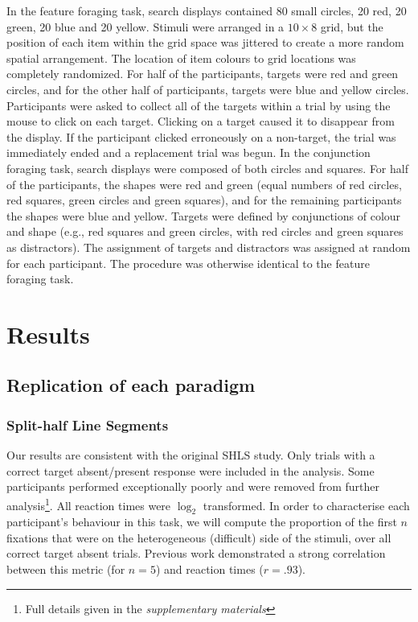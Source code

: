 \documentclass[]{rsos}%
\begin{document}
In the feature foraging task, search displays contained 80 small circles, 20 red, 20 green, 20 blue  and 20 yellow. Stimuli were arranged in a $10 \times 8$ grid, but the position of each item within the grid space was jittered to create a more random spatial arrangement. The location of item colours to grid locations was completely randomized. For half of the participants, targets were red and green circles, and for the other half of participants, targets were blue and yellow circles. Participants were asked to collect all of the targets within a trial by using the mouse to click on each target. Clicking on a target caused it to disappear from the display. If the participant clicked erroneously on a non-target, the trial was immediately ended and a replacement trial was begun. In the conjunction foraging task, search displays were composed of both circles and squares. For half of the participants, the shapes were red and green (equal numbers of red circles, red squares, green circles and green squares), and for the remaining participants the shapes were blue and yellow. Targets were defined by conjunctions of colour and shape (e.g., red squares and green circles, with red circles and green squares as distractors). The assignment of targets and distractors was assigned at random for each participant. The procedure was otherwise identical to the feature foraging task. 

\section{Results}

\subsection{Replication of each paradigm}

\subsubsection{Split-half Line Segments}

Our results are consistent with the original SHLS study\cite{nowakowska2017}. Only trials with a correct target absent/present response were included in the analysis. Some participants performed exceptionally poorly and were removed from further analysis\footnote{Full details given in the \textit{supplementary materials}}. All reaction times were $\log_2$ transformed. In order to characterise each participant's behaviour in this task, we will compute the proportion of the first $n$ fixations that were on the heterogeneous (difficult) side of the stimuli, over all correct target absent trials. Previous work\cite{nowakowska2017} demonstrated a strong correlation between this metric (for $n=5$) and reaction times ($r=.93$).
\end{document}
